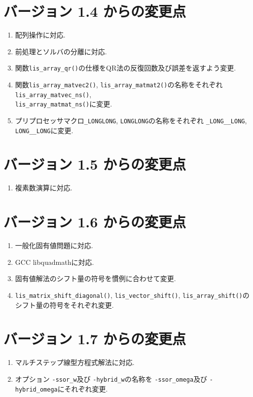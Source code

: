 \documentclass[a4paper]{jarticle}
\begin{document}
\section*{バージョン 1.4 からの変更点}
\begin{enumerate}
\item 配列操作に対応.
\item 前処理とソルバの分離に対応.
\item 関数{\tt lis\_array\_qr()}の仕様をQR法の反復回数及び誤差を返すよう変更. 
\item 関数{\tt lis\_array\_matvec2()}, {\tt lis\_array\_matmat2()}の名称をそれぞれ
  {\tt lis\_array\_matvec\_ns()}, \\
  {\tt lis\_array\_matmat\_ns()}に変更.
\item プリプロセッサマクロ{\tt \_LONGLONG}, {\tt LONGLONG}の名称をそれぞれ
      {\tt \_LONG\_\_LONG}, {\tt LONG\_\_LONG}に変更.
\end{enumerate}

\section*{バージョン 1.5 からの変更点}
\begin{enumerate}
\item 複素数演算に対応.
\end{enumerate}

\section*{バージョン 1.6 からの変更点}
\begin{enumerate}
\item 一般化固有値問題に対応.
\item GCC libquadmathに対応.  
\item 固有値解法のシフト量の符号を慣例に合わせて変更.
\item {\tt lis\_matrix\_shift\_diagonal()}, {\tt lis\_vector\_shift()}, {\tt lis\_array\_shift()}のシフト量の符号をそれぞれ変更. 
\end{enumerate}

\section*{バージョン 1.7 からの変更点}
\begin{enumerate}
\item マルチステップ線型方程式解法に対応.
\item オプション {\tt -ssor\_w}及び {\tt -hybrid\_w}の名称を {\tt -ssor\_omega}及び {\tt -hybrid\_omega}にそれぞれ変更.  
\end{enumerate}
\end{document}
